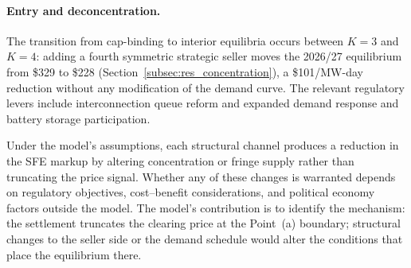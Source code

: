 \paragraph{Entry and deconcentration.}
The transition from cap-binding to interior equilibria occurs between
$K = 3$ and $K = 4$: adding a fourth symmetric strategic seller moves the
2026/27 equilibrium from \$329 to \$228 (Section~\ref{subsec:res_concentration}),
a \$101/MW-day reduction without any modification of the demand curve. The
relevant regulatory levers include interconnection queue reform
\citep{FERC2023_order2023, FERC2024_order2023A} and expanded demand response
and battery storage participation.

Under the model's assumptions, each structural channel produces a reduction
in the SFE markup by altering concentration or fringe supply rather than
truncating the price signal. Whether any of these changes is warranted
depends on regulatory objectives, cost--benefit considerations, and political
economy factors outside the model. The model's contribution is to identify
the mechanism: the settlement truncates the clearing price at the Point~(a)
boundary; structural changes to the seller side or the demand schedule would
alter the conditions that place the equilibrium there.
